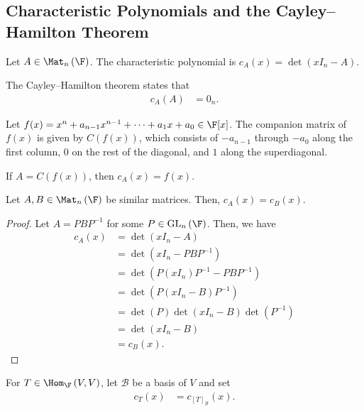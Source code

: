 \documentclass[10pt]{mypackage}
\begin{document}
\subsection{Characteristic Polynomials and the Cayley--Hamilton Theorem}%
\begin{definition}
  Let $A \in \Mat_{n}\left(\F\right)$. The characteristic polynomial is $c_{A}\left(x\right) = \det\left(xI_n - A\right)$.
\end{definition}
\begin{remark}
  The Cayley--Hamilton theorem states that
  \begin{align*}
    c_A(A) &=0_{n}.
  \end{align*}
\end{remark}
\begin{definition}
  Let $f(x) = x^n + a_{n-1}x^{n-1} +  \cdots + a_1 x + a_0\in \F[x]$. The companion matrix of $f(x)$ is given by $C\left(f(x)\right)$, which consists of $-a_{n-1}$ through $-a_0$ along the first column, $0$ on the rest of the diagonal, and $1$ along the superdiagonal.
\end{definition}
\begin{lemma}
  If $A = C\left(f(x)\right)$, then $c_{A}\left(x\right) = f(x)$.
\end{lemma}
\begin{lemma}
  Let $A,B\in \Mat_{n}\left(\F\right)$ be similar matrices. Then, $c_{A}\left(x\right) = c_{B}\left(x\right)$.
\end{lemma}
\begin{proof}
  Let $A = PBP^{-1}$ for some $P\in \text{GL}_{n}\left(\F\right)$. Then, we have
  \begin{align*}
    c_{A}\left(x\right) &= \det\left(xI_{n} - A\right)\\
                        &= \det\left(xI_{n}- PBP^{-1}\right)\\
                        &= \det\left(P\left(xI_n\right)P^{-1}-PBP^{-1}\right)\\
                        &= \det\left(P\left(xI_n - B\right)P^{-1}\right)\\
                        &= \det\left(P\right)\det\left(xI_n-B\right)\det\left(P^{-1}\right)\\
                        &= \det\left(xI_n - B\right)\\
                        &= c_B\left(x\right).
  \end{align*}
\end{proof}
\begin{definition}
  For $T\in \Hom_{\F}\left(V,V\right)$, let $\mathcal{B}$ be a basis of $V$ and set
  \begin{align*}
    c_T(x) &= c_{\left[T\right]_{\mathcal{B}}}(x).
  \end{align*}
\end{definition}
\end{document}
